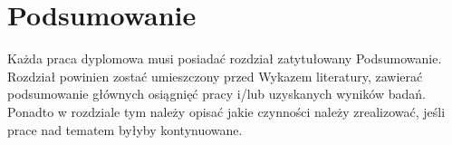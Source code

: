 \chapter{Podsumowanie} 

Każda praca dyplomowa musi posiadać rozdział zatytułowany Podsumowanie. Rozdział powinien zostać umieszczony przed Wykazem literatury, zawierać podsumowanie głównych osiągnięć pracy i/lub uzyskanych wyników badań. Ponadto w rozdziale tym należy opisać jakie czynności należy zrealizować, jeśli prace nad tematem byłyby kontynuowane. 
